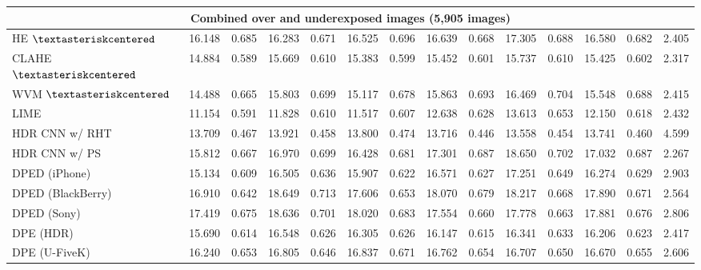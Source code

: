 \documentclass[final]{cvpr}
\begin{document}
\begin{table*}
\begin{center}
{\begin{tabular}{|l|c|c|c|c|c|c|c|c|c|c|c|c|c|}
\multicolumn{14}{|c|}{\cellcolor[HTML]{CCECEB}Combined over and underexposed images (5,905 images)}\\ \hline
HE \cite{10.5555/559707} $\textasteriskcentered$& 16.148 & \cellcolor[HTML]{FFCCCB}0.685 & 16.283 & 0.671 & 16.525 & \cellcolor[HTML]{FFCCCB}0.696  & 16.639 & 0.668 & 17.305 & 0.688 & 16.580 & 0.682 & 2.405\\
CLAHE \cite{adaptivehisteq} $\textasteriskcentered$& 14.884 & 0.589 & 15.669 &  0.610 & 15.383 & 0.599 & 15.452 & 0.601 & 15.737 & 0.610 & 15.425 & 0.602 & 2.317\\
WVM \cite{fu2016weighted} $\textasteriskcentered$&  14.488 & 0.665 & 15.803 & \cellcolor[HTML]{FFCCCB}0.699 & 15.117 & 0.678 & 15.863 & \cellcolor[HTML]{FFCCCB}0.693 & 16.469 & \cellcolor[HTML]{FFCCCB}0.704 & 15.548 & 0.688 & 2.415\\
\cellcolor[HTML]{D5D5D5}LIME \cite{guo2016lime, guo2017lime} & 11.154 & 0.591 & 11.828 & 0.610 & 11.517 & 0.607 & 12.638 & 0.628 & 13.613 & 0.653 & 12.150 & 0.618 & 2.432\\
HDR CNN \cite{HDRCNN} w/ RHT \cite{yang2018image}& 13.709 & 0.467 & 13.921 & 0.458 & 13.800 & 0.474 & 13.716 & 0.446 & 13.558 & 0.454 & 13.741 & 0.460 & 4.599\\
HDR CNN \cite{HDRCNN} w/ PS \cite{dayley2010photoshop}  & 15.812 & 0.667 & 16.970 & 0.699 & 16.428 & 0.681 & 17.301 & 0.687 & 18.650  & 0.702 & 17.032 & \cellcolor[HTML]{FFCCCB}0.687 & \cellcolor[HTML]{FFCCCB}2.267\\
DPED (iPhone) \cite{DPED}& 15.134 & 0.609 & 16.505 & 0.636 & 15.907 & 0.622 & 16.571 & 0.627 & 17.251 & 0.649 & 16.274 & 0.629 & 2.903\\
DPED (BlackBerry) \cite{DPED} & 16.910 & 0.642 & \cellcolor[HTML]{FFCCCB}18.649 & \cellcolor[HTML]{FFCCCB}0.713 & 17.606 & 0.653 & \cellcolor[HTML]{FFCCCB}18.070 & 0.679 & 18.217 & 0.668 & \cellcolor[HTML]{FFCCCB}17.890 & 0.671 & 2.564\\
DPED (Sony) \cite{DPED}& \cellcolor[HTML]{FFCCCB}17.419  & 0.675 & 18.636 & 0.701 & \cellcolor[HTML]{FFCCCB}18.020  & 0.683 &  17.554 & 0.660 & \cellcolor[HTML]{FFCCCB}17.778 & 0.663 & 17.881 & 0.676 & 2.806\\
DPE (HDR) \cite{DPE} & 15.690 & 0.614 & 16.548 & 0.626 & 16.305 & 0.626 & 16.147 & 0.615 & 16.341 & 0.633 & 16.206 & 0.623 & 2.417\\
DPE (U-FiveK) \cite{DPE} & 16.240 & 0.653 & 16.805 & 0.646 & 16.837 & 0.671 &  16.762 & 0.654 & 16.707 & 0.650 & 16.670 & 0.655 & 2.606\\

\end{tabular}}
\end{center}
\end{table*}
\end{document}
